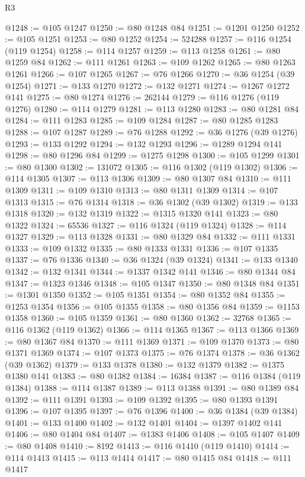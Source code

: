 \begin{lexlean}{R3}
\begin{coremodule}
@1248 := @105 @1247
@1250 := @80 @1248 @84
@1251 := @1201 @1250
@1252 := @105 @1251
@1253 := @80 @1252
@1254 := 524288
@1257 := @116 @1254 (@119 @1254)
@1258 := @114 @1257
@1259 := @113 @1258
@1261 := @80 @1259 @84
@1262 := @111 @1261
@1263 := @109 @1262
@1265 := @80 @1263 @1261
@1266 := @107 @1265
@1267 := @76 @1266
@1270 := @36 @1254 (@39 @1254)
@1271 := @133 @1270
@1272 := @132 @1271
@1274 := @1267 @1272 @141
@1275 := @80 @1274
@1276 := 262144
@1279 := @116 @1276 (@119 @1276)
@1280 := @114 @1279
@1281 := @113 @1280
@1283 := @80 @1281 @84
@1284 := @111 @1283
@1285 := @109 @1284
@1287 := @80 @1285 @1283
@1288 := @107 @1287
@1289 := @76 @1288
@1292 := @36 @1276 (@39 @1276)
@1293 := @133 @1292
@1294 := @132 @1293
@1296 := @1289 @1294 @141
@1298 := @80 @1296 @84
@1299 := @1275 @1298
@1300 := @105 @1299
@1301 := @80 @1300
@1302 := 131072
@1305 := @116 @1302 (@119 @1302)
@1306 := @114 @1305
@1307 := @113 @1306
@1309 := @80 @1307 @84
@1310 := @111 @1309
@1311 := @109 @1310
@1313 := @80 @1311 @1309
@1314 := @107 @1313
@1315 := @76 @1314
@1318 := @36 @1302 (@39 @1302)
@1319 := @133 @1318
@1320 := @132 @1319
@1322 := @1315 @1320 @141
@1323 := @80 @1322
@1324 := 65536
@1327 := @116 @1324 (@119 @1324)
@1328 := @114 @1327
@1329 := @113 @1328
@1331 := @80 @1329 @84
@1332 := @111 @1331
@1333 := @109 @1332
@1335 := @80 @1333 @1331
@1336 := @107 @1335
@1337 := @76 @1336
@1340 := @36 @1324 (@39 @1324)
@1341 := @133 @1340
@1342 := @132 @1341
@1344 := @1337 @1342 @141
@1346 := @80 @1344 @84
@1347 := @1323 @1346
@1348 := @105 @1347
@1350 := @80 @1348 @84
@1351 := @1301 @1350
@1352 := @105 @1351
@1354 := @80 @1352 @84
@1355 := @1253 @1354
@1356 := @105 @1355
@1358 := @80 @1356 @84
@1359 := @1153 @1358
@1360 := @105 @1359
@1361 := @80 @1360
@1362 := 32768
@1365 := @116 @1362 (@119 @1362)
@1366 := @114 @1365
@1367 := @113 @1366
@1369 := @80 @1367 @84
@1370 := @111 @1369
@1371 := @109 @1370
@1373 := @80 @1371 @1369
@1374 := @107 @1373
@1375 := @76 @1374
@1378 := @36 @1362 (@39 @1362)
@1379 := @133 @1378
@1380 := @132 @1379
@1382 := @1375 @1380 @141
@1383 := @80 @1382
@1384 := 16384
@1387 := @116 @1384 (@119 @1384)
@1388 := @114 @1387
@1389 := @113 @1388
@1391 := @80 @1389 @84
@1392 := @111 @1391
@1393 := @109 @1392
@1395 := @80 @1393 @1391
@1396 := @107 @1395
@1397 := @76 @1396
@1400 := @36 @1384 (@39 @1384)
@1401 := @133 @1400
@1402 := @132 @1401
@1404 := @1397 @1402 @141
@1406 := @80 @1404 @84
@1407 := @1383 @1406
@1408 := @105 @1407
@1409 := @80 @1408
@1410 := 8192
@1413 := @116 @1410 (@119 @1410)
@1414 := @114 @1413
@1415 := @113 @1414
@1417 := @80 @1415 @84
@1418 := @111 @1417

\end{coremodule}
\end{lexlean}
